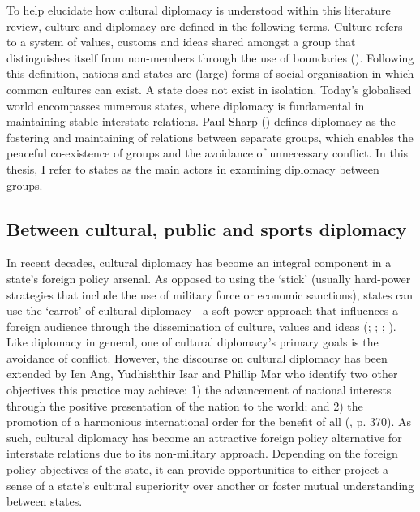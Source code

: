 To help elucidate how cultural diplomacy is understood within this literature review, culture and diplomacy are defined in the following terms. Culture refers to a system of values, customs and ideas shared amongst a group that distinguishes itself from non-members through the use of boundaries (\cite{cohen1985}). Following this definition, nations and states are (large) forms of social organisation in which common cultures can exist. A state does not exist in isolation. Today’s globalised world encompasses numerous states, where diplomacy is fundamental in maintaining stable interstate relations. Paul Sharp (\citeyear{sharp2003}) defines diplomacy as the fostering and maintaining of relations between separate groups, which enables the peaceful co-existence of groups and the avoidance of unnecessary conflict. In this thesis, I refer to states as the main actors in examining diplomacy between groups.

\subsection*{Between cultural, public and sports diplomacy}

In recent decades, cultural diplomacy has become an integral component in a state’s foreign policy arsenal. As opposed to using the ‘stick’ (usually hard-power strategies that include the use of military force or economic sanctions), states can use the ‘carrot’ of cultural diplomacy - a soft-power approach that influences a foreign audience through the dissemination of culture, values and ideas (\cite{snow2008}; \cite{ang2015}; \cite{chitty2016}; \cite{hartig2016}). Like diplomacy in general, one of cultural diplomacy’s primary goals is the avoidance of conflict. However, the discourse on cultural diplomacy has been extended by Ien Ang, Yudhishthir Isar and Phillip Mar who identify two other objectives this practice may achieve:  1) the advancement of national interests through the positive presentation of the nation to the world; and 2) the promotion of a harmonious international order for the benefit of all (\citeyear{ang2015}, p. 370). As such, cultural diplomacy has become an attractive foreign policy alternative for interstate relations due to its non-military approach. Depending on the foreign policy objectives of the state, it can provide opportunities to either project a sense of a state’s cultural superiority over another or foster mutual understanding between states.

